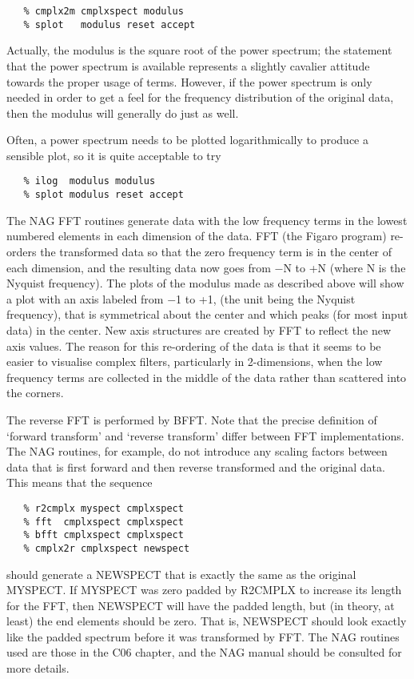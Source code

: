 \begin{verbatim}
   % cmplx2m cmplxspect modulus
   % splot   modulus reset accept
\end{verbatim}

Actually, the modulus is the square root of the power spectrum; the
statement that the power spectrum is available represents a slightly
cavalier attitude towards the proper usage of terms.  However, if the
power spectrum is only needed in order to get a feel for the frequency
distribution of the original data, then the modulus will generally do 
just as well.

Often, a power spectrum needs to be plotted logarithmically to
produce a sensible plot, so it is quite acceptable to try

\begin{verbatim}
   % ilog  modulus modulus
   % splot modulus reset accept
\end{verbatim}

The NAG FFT routines generate data with the low frequency terms in
the lowest numbered elements in each dimension of the data.  FFT (the Figaro
program) re-orders the transformed data so that the zero frequency term is
in the center of each dimension, and the resulting data now goes from $-$N to
+N (where N is the Nyquist frequency).  The plots of the modulus made as
described above will show a plot with an axis labeled from $-$1 to +1, (the
unit being the Nyquist frequency), that is symmetrical about the center and
which peaks (for most input data) in the center.  New axis structures are
created by FFT to reflect the new axis values.  The reason for this
re-ordering of the data is that it seems to be easier to visualise complex
filters, particularly in 2-dimensions, when the low frequency terms are 
collected in the middle of the data rather than scattered into the corners.

The reverse FFT is performed by BFFT.  Note that the precise definition 
of `forward transform' and `reverse transform' differ between FFT
implementations.  The NAG routines, for example, do not introduce any scaling
factors between data that is first forward and then reverse transformed and
the original data.  This means that the sequence

\begin{verbatim}
   % r2cmplx myspect cmplxspect
   % fft  cmplxspect cmplxspect
   % bfft cmplxspect cmplxspect
   % cmplx2r cmplxspect newspect
\end{verbatim}

should generate a NEWSPECT that is exactly the same as the original MYSPECT.
If MYSPECT was zero padded by R2CMPLX to increase its length for the FFT,
then NEWSPECT will have the padded length, but (in theory, at least) the
end elements should be zero.  That is, NEWSPECT should look exactly like the
padded spectrum before it was transformed by FFT.  The NAG routines used are
those in the C06 chapter, and the NAG manual should be consulted for more
details.


